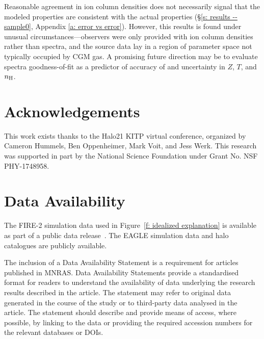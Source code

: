 \documentclass[fleqn,usenatbib]{mnras}
\begin{document}
Reasonable agreement in ion column densities does not necessarily signal that the modeled properties are consistent with the actual properties (\S\ref{s: results -- sample0}, Appendix \ref{a: error vs error}).
However, this results is found under unusual circumstances---observers were only provided with ion column densities rather than spectra, and the source data lay in a region of parameter space not typically occupied by CGM gas.
A promising future direction may be to evaluate spectra goodness-of-fit as a predictor of accuracy of and uncertainty in $Z$, $T$, and $n_{\rm H}$.

\section*{Acknowledgements}

This work exists thanks to the Halo21 KITP virtual conference, organized by Cameron Hummels, Ben Oppenheimer, Mark Voit, and Jess Werk.
This research was supported in part by the National Science Foundation under Grant No. NSF PHY-1748958.

\section*{Data Availability}

The FIRE-2 simulation data used in Figure~\ref{f: idealized explanation} is available as part of a public data release~\citep{wetzel2022Public}.
The EAGLE simulation data \citep{EagleTeam2017} and halo catalogues \citep{McAlpine2016} are publicly available. 

The inclusion of a Data Availability Statement is a requirement for articles published in MNRAS. Data Availability Statements provide a standardised format for readers to understand the availability of data underlying the research results described in the article. The statement may refer to original data generated in the course of the study or to third-party data analysed in the article. The statement should describe and provide means of access, where possible, by linking to the data or providing the required accession numbers for the relevant databases or DOIs.




\end{document}
